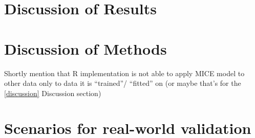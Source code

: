 \section{Discussion of Results}
\section{Discussion of Methods}
\begin{changemargin}{50pt}{50pt}
Shortly mention that R implementation is not able to apply MICE model to other 
data only to data it is ``trained''/ ``fitted'' on (or maybe that's for the 
\ref{discussion} Discussion section)
\end{changemargin}
\section{Scenarios for real-world validation}
